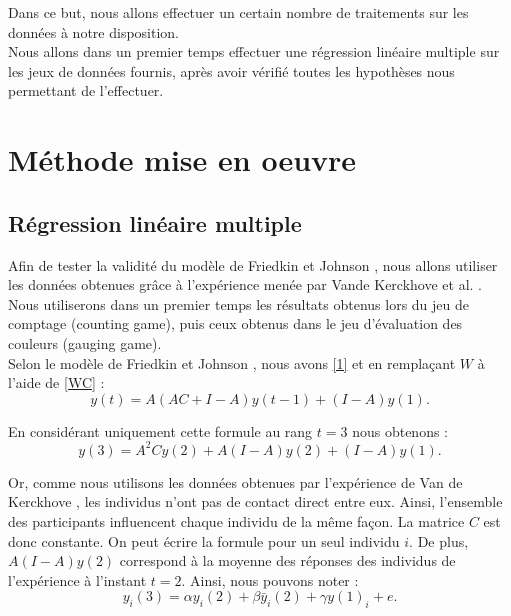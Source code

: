 \documentclass{scrreprt}
\begin{document}
Dans ce but, nous allons effectuer un certain nombre de traitements sur les données à notre disposition. \\

Nous allons dans un premier temps effectuer une régression linéaire multiple sur les jeux de données fournis, après avoir vérifié toutes les hypothèses nous permettant de l'effectuer. \\

\chapter{Méthode mise en oeuvre}

\section{Régression linéaire multiple}

Afin de tester la validité du modèle de Friedkin et Johnson \cite{FJ}, nous allons utiliser les données obtenues grâce à l’expérience menée par Vande Kerckhove et al. \cite{VMG}. Nous utiliserons dans un premier temps les résultats obtenus lors du jeu de comptage (counting game), puis ceux obtenus dans le jeu d’évaluation des couleurs (gauging game).\\

Selon le modèle de Friedkin et Johnson \cite{FJ}, nous avons \eqref{1} et en remplaçant $W$ à l’aide de \eqref{WC} :\\

\begin{equation}
\label{21}
y(t) =A(AC+I-A)y(t-1)+(I-A)y(1).
\end{equation}

En considérant uniquement cette formule au rang $t = 3$ nous obtenons :\\
\begin{equation}
\label{22}
y(3) = A^2C y(2) + A(I-A)y(2) + (I-A)y(1).
\end{equation}

Or, comme nous utilisons les données obtenues par l'expérience de Van de Kerckhove \cite{VMG}, les individus n'ont pas de contact direct entre eux. Ainsi, l'ensemble des participants influencent chaque individu de la même façon. La matrice $C$ est donc constante. On peut écrire la formule pour un seul individu $i$.
De plus, $A(I-A)y(2)$ correspond à la moyenne des réponses des individus de l'expérience à l'instant $t=2$. Ainsi, nous pouvons noter :\\
\begin{equation}
\label{23}
y_{i}(3) = \alpha y_{i}(2) + \beta \bar{y}_{i}(2) + \gamma y(1)_{i} + e.
\end{equation}
\end{document}
